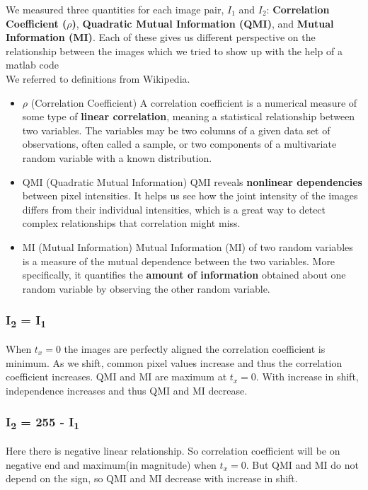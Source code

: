 \documentclass[12pt]{article}
\begin{document}
We measured three quantities for each image pair, $I_1$ and $I_2$: \textbf{Correlation Coefficient ($\rho$)}, \textbf{Quadratic Mutual Information (QMI)}, and \textbf{Mutual Information (MI)}. Each of these gives us different perspective on the relationship between the images which we tried to show up with the help of a matlab code\\
We referred to definitions from Wikipedia.
\begin{itemize}

    \item{$\rho$ (Correlation Coefficient)}
A correlation coefficient is a numerical measure of some type of \textbf{linear correlation}, meaning a statistical relationship between two variables. The variables may be two columns of a given data set of observations, often called a sample, or two components of a multivariate random variable with a known distribution. 

    \item{QMI (Quadratic Mutual Information)}
QMI reveals \textbf{nonlinear dependencies} between pixel intensities. It helps us see how the joint intensity of the images differs from their individual intensities, which is a great way to detect complex relationships that correlation might miss.

    \item{MI (Mutual Information)}
Mutual Information (MI) of two random variables is a measure of the mutual dependence between the two variables. More specifically, it quantifies the \textbf{amount of information} obtained about one random variable by observing the other random variable. 
\end{itemize}



\subsubsection{I\textsubscript{2} = I\textsubscript{1}}
When $t_x =0 $ the images are perfectly aligned the correlation coefficient is minimum. As we shift, common pixel values increase and thus the correlation coefficient increases. QMI and MI are maximum at $t_x=0$. With increase in shift, independence increases and thus QMI and MI decrease.

\subsubsection{I\textsubscript{2} = 255 - I\textsubscript{1}}
Here there is negative linear relationship. So correlation coefficient will be on negative end and maximum(in magnitude) when $t_x=0$. But QMI and MI do not depend on the sign, so QMI and MI decrease with increase in shift. 
\end{document}
